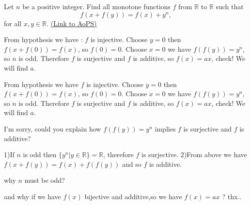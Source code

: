 \begin{problem}
	Let $n$ be a positive integer. Find all monotone functions $f$ from $\mathbb R$ to $\mathbb R$ such that 
\[f(x+f(y))=f(x)+y^{n},\]
for all $x,y \in \mathbb R$.
	\flushright \href{https://artofproblemsolving.com/community/c6h149165}{(Link to AoPS)}
\end{problem}



\begin{mysolution}
	From hypothesis we have : $f$ is injective.
Choose $y=0$ then $f(x+f(0))=f(x)$, so $f(0)=0$.
Choose $x=0$ we have $f(f(y))=y^{n}$, so $n$ is odd. Therefore $f$ is surjective and $f$ is additive, so $f(x)=ax$, check! We will find $a$.
\end{mysolution}



\begin{mysolution}
	\begin{tcolorbox}From hypothesis we have $f$ is injective.
Choose $y=0$ then $f(x+f(0))=f(x)$, so $f(0)=0$.
Choose $x=0$ we have $f(f(y))=y^{n}$, so $n$ is odd. Therefore $f$ is surjective and $f$ is additive, so $f(x)=ax$, check! We will find $a$.\end{tcolorbox}

I'm sorry, could you explain how $f(f(y))=y^{n}$ implies $f$ is surjective and $f$ is additive?
\end{mysolution}



\begin{mysolution}
	1)If $n$ is odd then $\{y^{n}|y\in\mathbb{R}\}=\mathbb{R}$, therefore $f$ is surjective.
2)From above we have $f(x+f(y))=f(x)+f(f(y))$ and so $f$ is additive.
\end{mysolution}



\begin{mysolution}
	why $n$ must be odd?

and why if we have $f(x)$ bijective and additive,so we have $f(x)=ax$ ?
thx..
\end{mysolution}



